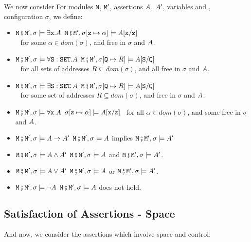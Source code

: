 \begin{definition}  
We now consider \label{def:valid:assertion:logical}
For modules $\M$, $\M'$, assertions $\A$, $\A'$, variables  and ,  configuration $\sigma$, we define$:$
\begin{itemize}
\item
$\M\mkpair \M', \sigma \models \exists \prg{x}.\A$ \IFF
$\M\mkpair \M', \sigma[\prg{z}\mapsto \alpha] \models  \A[\prg{x}/\prg{z}]$\\
$\strut ~ $ \hfill for some  $\alpha\in dom(\sigma)$, and    free in $\sigma$ and $\A$.
\item
$\M\mkpair \M', \sigma \models \forall \prg{S}:\prg{SET}.\A$ \IFF  $\M\mkpair \M', \sigma[\prg{Q}\mapsto R] \models  \A[\prg{S}/\prg{Q}]$ \\
$\strut ~ $ \hfill for all sets of addresses $R\subseteq dom(\sigma)$, and  all  free in $\sigma$ and $\A$.
\item
$\M\mkpair \M', \sigma \models \exists \prg{S}:\prg{SET}\!.\,\A$ \IFF  $\M\mkpair \M', \sigma[\prg{Q}\mapsto R] \models  \A[\prg{S}/\prg{Q}]$ \\
 $\strut ~ $ \hfill  for some set of addresses $R\subseteq dom(\sigma)$, and    free in $\sigma$ and $\A$.
\item
$\M\mkpair \M', \sigma \models \forall \prg{x}.\A$ \IFF
$\sigma[\prg{z}\mapsto \alpha] \models  \A[\prg{x}/\prg{z}]$ \ for all  $\alpha\in dom(\sigma)$, and  some  free in $\sigma$ and $\A$.
\item
$\M\mkpair \M', \sigma \models \A \rightarrow \A' $ \IFF  $\M\mkpair \M', \sigma \models \A $ implies $\M\mkpair \M', \sigma \models \A' $
\item
$\M\mkpair \M', \sigma \models  \A \wedge \A'$   \IFF  $\M\mkpair \M', \sigma \models  \A $
and $\M\mkpair \M', \sigma \models  \A'$.
\item
$\M\mkpair \M', \sigma \models  \A \vee \A'$   \IFF  $\M\mkpair \M', \sigma \models  \A $
or $\M\mkpair \M', \sigma \models  \A'$.
\item
$\M\mkpair \M', \sigma \models  \neg\A$   \IFF  $\M\mkpair \M', \sigma \models  \A $
does not hold.
\end{itemize}
\end{definition}

\subsection{Satisfaction of Assertions - Space}
And now, we consider the assertions which involve space and  control:


